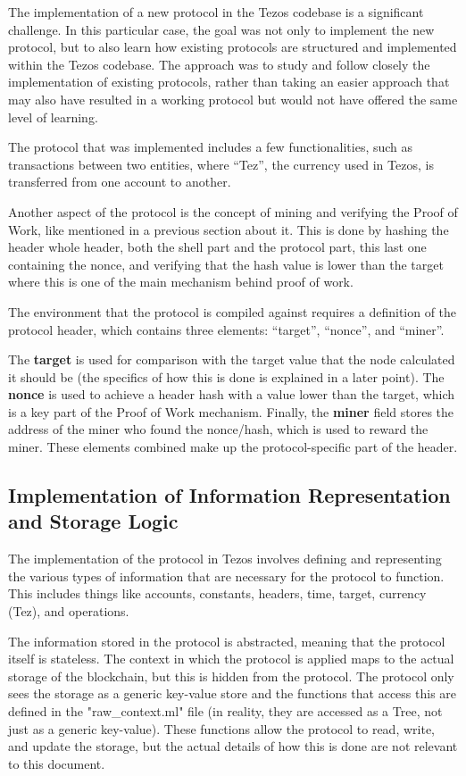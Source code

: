 The implementation of a new protocol in the Tezos codebase is a significant challenge.
In this particular case, the goal was not only to implement the new protocol, but to also learn how existing protocols are structured and implemented within the Tezos codebase. The approach was to study and follow closely the implementation of existing protocols, rather than taking an easier approach that may also have resulted in a working protocol but would not have offered the same level of learning.

The protocol that was implemented includes a few functionalities, such as transactions between two entities, where ``Tez'', the currency used in Tezos, is transferred from one account to another.

Another aspect of the protocol is the concept of mining and verifying the Proof of Work, like mentioned in a previous section about it.
This is done by hashing the header whole header, both the shell part and the protocol part, this last one containing the nonce, and verifying that the hash value is lower than the target where this is one of the main mechanism behind proof of work.

The environment that the protocol is compiled against requires a definition of the protocol header, which contains three elements: ``target'', ``nonce'', and ``miner''.

The \textbf{target} is used for comparison with the target value that the node calculated it should be (the specifics of how this is done is explained in a later point).
The \textbf{nonce} is used to achieve a header hash with a value lower than the target, which is a key part of the Proof of Work mechanism.
Finally, the \textbf{miner} field stores the address of the miner who found the nonce/hash, which is used to reward the miner. These elements combined make up the protocol-specific part of the header.


\subsection*{Implementation of Information Representation and Storage Logic}

The implementation of the protocol in Tezos involves defining and representing the various types of information that are necessary for the protocol to function. This includes things like accounts, constants, headers, time, target, currency (Tez), and operations.

The information stored in the protocol is abstracted, meaning that the protocol itself is stateless. The context in which the protocol is applied maps to the actual storage of the blockchain, but this is hidden from the protocol. The protocol only sees the storage as a generic key-value store and the functions that access this are defined in the "raw\_context.ml" file (in reality, they are accessed as a Tree, not just as a generic key-value). These functions allow the protocol to read, write, and update the storage, but the actual details of how this is done are not relevant to this document.

